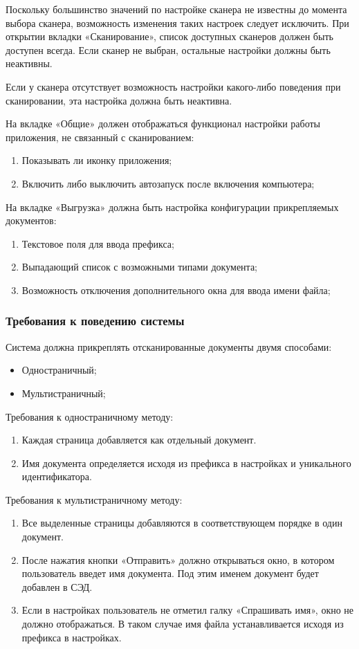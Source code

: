 Поскольку большинство значений по настройке сканера не известны до момента выбора сканера, возможность изменения таких настроек следует исключить. При открытии вкладки «Сканирование», список доступных сканеров должен быть доступен всегда. Если сканер не выбран, остальные настройки должны быть неактивны.

Если у сканера отсутствует возможность настройки какого-либо поведения при сканировании, эта настройка должна быть неактивна.

На вкладке «Общие» должен отображаться функционал настройки работы приложения, не связанный с сканированием:
\begin{enumerate}
	\item Показывать ли иконку приложения;
	\item Включить либо выключить автозапуск после включения компьютера;
\end{enumerate}

На вкладке «Выгрузка» должна быть настройка конфигурации прикрепляемых документов:
\begin{enumerate}
	\item Текстовое поля для ввода префикса;
	\item Выпадающий список с возможными типами документа;
	\item Возможность отключения дополнительного окна для ввода имени файла;
\end{enumerate}

\subsubsection{Требования к поведению системы}
\label{sub:requirements:func_rec:requirements_system}

Система должна прикреплять отсканированные документы двумя способами:
\begin{itemize}
	\item Одностраничный;
	\item Мультистраничный;
\end{itemize}

Требования к одностраничному методу:
\begin{enumerate}
	\item Каждая страница добавляется как отдельный документ.
	\item Имя документа определяется исходя из префикса в настройках и уникального идентификатора.
\end{enumerate}

Требования к мультистраничному методу:
\begin{enumerate}
	\item Все выделенные страницы добавляются в соответствующем порядке в один документ.
	\item После нажатия кнопки «Отправить» должно открываться окно, в котором пользователь введет имя документа. Под этим именем документ будет добавлен в СЭД.
	\item Если в настройках пользователь не отметил галку «Спрашивать имя», окно не должно отображаться. В таком случае имя файла устанавливается исходя из префикса в настройках.
\end{enumerate}

